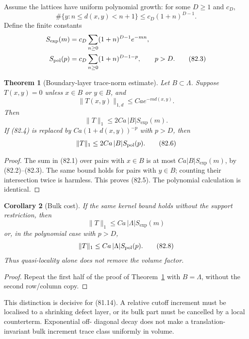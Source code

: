 \documentclass[11pt]{article}
\newtheorem{theorem}{Theorem}[section]
\newtheorem{corollary}[theorem]{Corollary}
\begin{document}
Assume the lattices have uniform polynomial growth: for some
\(D\ge1\) and \(c_D\),
\[
 \#\{y:n\le d(x,y)<n+1\}\le c_D(1+n)^{D-1}.                  \tag{82.2}
\]
Define the finite constants
\[
 \begin{split}
 S_{\exp}(m)&=c_D\sum_{n\ge0}(1+n)^{D-1}e^{-mn},\\
 S_{\rm pol}(p)&=c_D\sum_{n\ge0}(1+n)^{D-1-p},
                         \qquad p>D.                         \tag{82.3}
 \end{split}
\]

\begin{theorem}[Boundary-layer trace-norm estimate]
\label{thm:v11v82-boundary}
Let \(B\subset\Lambda\).  Suppose \(T(x,y)=0\) unless
\(x\in B\) or \(y\in B\), and
\[
                 \|T(x,y)\|_{1,d}
                 \le Ca e^{-m d(x,y)}.                      \tag{82.4}
\]
Then
\[
                              \|T\|_1
                    \le2Ca\,|B|S_{\exp}(m).                 \tag{82.5}
\]
If (82.4) is replaced by
\(Ca(1+d(x,y))^{-p}\) with \(p>D\), then
\[
                              \|T\|_1
                    \le2Ca\,|B|S_{\rm pol}(p).              \tag{82.6}
\]
\end{theorem}

\begin{proof}
The sum in (82.1) over pairs with \(x\in B\) is at most
\(Ca|B|S_{\exp}(m)\), by (82.2)--(82.3).  The same bound holds for
pairs with \(y\in B\); counting their intersection twice is harmless.
This proves (82.5).  The polynomial calculation is identical.
\end{proof}

\begin{corollary}[Bulk cost]
\label{cor:v11v82-bulk}
If the same kernel bound holds without the support restriction, then
\[
 \|T\|_1\le Ca\,|\Lambda|S_{\exp}(m)                         \tag{82.7}
\]
or, in the polynomial case with \(p>D\),
\[
 \|T\|_1\le Ca\,|\Lambda|S_{\rm pol}(p).                     \tag{82.8}
\]
Thus quasi-locality alone does not remove the volume factor.
\end{corollary}

\begin{proof}
Repeat the first half of the proof of
Theorem~\ref{thm:v11v82-boundary} with \(B=\Lambda\), without the
second row/column copy.
\end{proof}

This distinction is decisive for (81.14).  A relative cutoff
increment must be localised to a shrinking defect layer, or its bulk
part must be cancelled by a local counterterm.  Exponential off-
diagonal decay does not make a translation-invariant bulk increment
trace class uniformly in volume.
\end{document}
